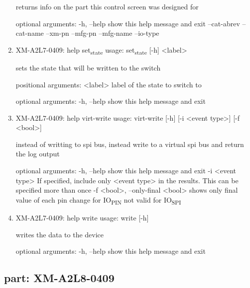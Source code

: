 \documentclass[11pt]{article}
\begin{document}
\begin{enumerate}
returns info on the part this control screen was designed for

optional arguments:
  -h, --help   show this help message and exit
  --cat-abrev
  --cat-name
  --xm-pn
  --mfg-pn
  --mfg-name
  --io-type

\item XM-A2L7-0409: help set\textsubscript{state}
\label{sec:orgf093f59}
usage: set\textsubscript{state} [-h] <label>

sets the state that will be written to the switch

positional arguments:
  <label>     label of the state to switch to

optional arguments:
  -h, --help  show this help message and exit

\item XM-A2L7-0409: help virt-write
\label{sec:orgaefd7fb}
usage: virt-write [-h] [-i <event type>] [-f <bool>]

instead of writting to spi bus, instead write to a virtual spi bus and return
the log output

optional arguments:
  -h, --help            show this help message and exit
  -i <event type>       If specified, include only <event type> in the
                        results. This can be specified more than once
  -f <bool>, --only-final <bool>
                        shows only final value of each pin change for IO\textsubscript{PIN}
                        not valid for IO\textsubscript{SPI}

\item XM-A2L7-0409: help write
\label{sec:org03c1bab}
usage: write [-h]

writes the data to the device

optional arguments:
  -h, --help  show this help message and exit
\end{enumerate}

\subsection{part: XM-A2L8-0409}
\label{sec:org1283c1d}
\end{document}
